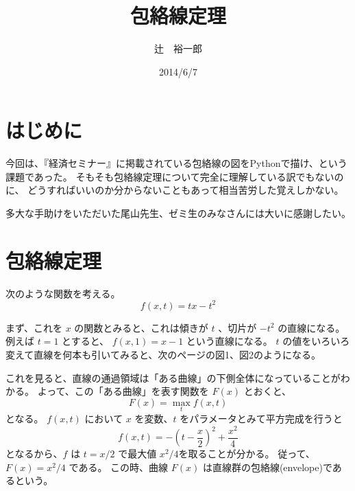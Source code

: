 \documentclass[11pt,a4j,fleqn]{jarticle}
\title{包絡線定理}
\author{辻　裕一郎}
\date{2014/6/7}
\begin{document}
\maketitle

\section{はじめに}
今回は、『経済セミナー』に掲載されている包絡線の図をPythonで描け、という課題であった。
そもそも包絡線定理について完全に理解している訳でもないのに、
どうすればいいのか分からないこともあって相当苦労した覚えしかない。

多大な手助けをいただいた尾山先生、ゼミ生のみなさんには大いに感謝したい。

\section{包絡線定理}

次のような関数を考える。
\begin{equation}
f(x, t) =  tx -t^2 
\end{equation}

まず、これを $x$ の関数とみると、これは傾きが $t$ 、切片が $-t^2$ の直線になる。
例えば $t = 1$ とすると、 $f(x, 1) = x - 1 $ という直線になる。
$t$ の値をいろいろ変えて直線を何本も引いてみると、次のページの図1、図2のようになる。

これを見ると、直線の通過領域は「ある曲線」の下側全体になっていることがわかる。
よって、この「ある曲線」を表す関数を $ F (x) $ とおくと、
\begin{equation}
F(x) = \max_{t} {f(x , t)}
\end{equation}
となる。
$f(x, t)$ において $x$ を変数、$t$ をパラメータとみて平方完成を行うと
\begin{equation}
 f(x, t) = -\left(t - \frac{x}{2}\right)^2 + \frac{x^2}{4} 
\end{equation}
となるから、$f$ は $ t = x / 2 $ で最大値 $ x^2 / 4 $を取ることが分かる。
従って、 $F(x) = x^2/4$ である。 この時、曲線 $F(x)$ は直線群の包絡線(envelope)であるという。

\newpage
\end{document}
